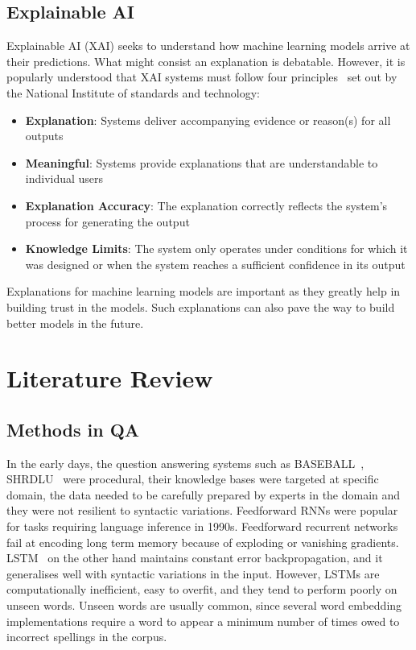 \documentclass[10pt,twocolumn,letterpaper]{article}
\begin{document}
\subsection{Explainable AI}
\label{XAIintro}
Explainable AI (XAI) seeks to understand how machine learning models arrive at their predictions. What might consist an explanation is debatable. However, it is popularly understood that XAI systems must follow four principles~\cite{Nist} set out by the National Institute of standards and technology:
\begin{itemize}[itemsep=0.3pt]
    \item \textbf{Explanation}: Systems deliver accompanying evidence or reason(s) for all outputs
    \item \textbf{Meaningful}: Systems provide explanations that are understandable to individual users
    \item \textbf{Explanation Accuracy}: The explanation correctly reflects the system’s process for generating the output 
    \item \textbf{Knowledge Limits}: The system only operates under conditions for which it was designed or when the system reaches a sufficient confidence in its output
\end{itemize}

Explanations for machine learning models are important as they greatly help in building trust in the models. Such explanations can also pave the way to build better models in the future. 

\section{Literature Review}
\subsection{Methods in QA}
In the early days, the question answering systems such as BASEBALL~\cite{BASEBALL}, SHRDLU~\cite{SHRDLU} were procedural, their knowledge bases were targeted at specific domain, the data needed to be carefully prepared by experts in the domain and they were not resilient to syntactic variations. Feedforward RNNs were popular for tasks requiring language inference in 1990s. Feedforward recurrent networks fail at encoding long term memory because of exploding or vanishing gradients. LSTM~\cite{LSTM} on the other hand maintains constant error backpropagation, and it generalises well with syntactic variations in the input. However, LSTMs are computationally inefficient, easy to overfit, and they tend to perform poorly on unseen words. Unseen words are usually common, since several word embedding implementations require a word to appear a minimum number of times owed to incorrect spellings in the corpus.
\end{document}
